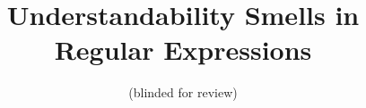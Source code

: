 \documentclass[conference]{IEEEtran}
\begin{document}
%
\title{Understandability Smells in Regular Expressions}

\author{(blinded for review)}
\iffalse
\author{
\IEEEauthorblockN{Carl Chapman\IEEEauthorrefmark{1}\thanks{* The work was done while this author was in Iowa State Univeristy}}
\IEEEauthorblockA{Sandia National Laboratories\\
Albuquerque, NM\\
carlallenchapman@gmail.com}
\and 
\IEEEauthorblockN{Peipei Wang}
\IEEEauthorblockA{Department of Computer Science\\
North Carolina State University\\
pwang7@ncsu.edu}  
\and 
\IEEEauthorblockN{Kathryn T. Stolee}
\IEEEauthorblockA{Department of Computer Science\\
North Carolina State University\\
ktstolee@ncsu.edu}  
}
\fi



\maketitle
\end{document}

